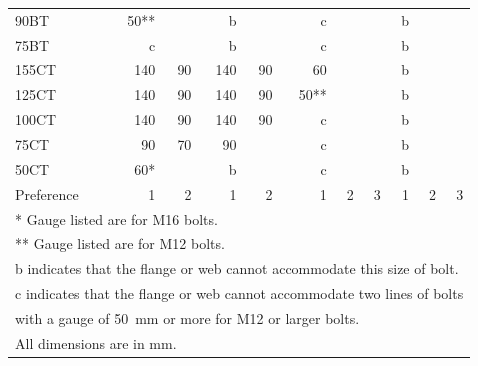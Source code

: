\begin{table}[H]
\begin{minipage}{.8\linewidth}
\begin{tabular}{l|rr|rr|rrr|rrr}
	90BT                        & 50** &                   &   b &                    &    c &    &              &   b &    &              \\
	75BT                        &    c &                   &   b &                    &    c &    &              &   b &    &              \\
	155CT                       &  140 &                90 & 140 &                 90 &   60 &    &              &   b &    &              \\
	125CT                       &  140 &                90 & 140 &                 90 & 50** &    &              &   b &    &              \\
	100CT                       &  140 &                90 & 140 &                 90 &    c &    &              &   b &    &              \\
	75CT                        &   90 &                70 &  90 &                    &    c &    &              &   b &    &              \\
	50CT                        &  60* &                   &   b &                    &    c &    &              &   b &    &              \\
	Preference                  &    1 &                 2 &   1 &                  2 &    1 &  2 &            3 &   1 &  2 &            3 \\ \bottomrule
	\multicolumn{11}{l}{* Gauge listed are for M16 bolts.}                                                                                 \\
	\multicolumn{11}{l}{** Gauge listed are for M12 bolts.}                                                                                \\
	\multicolumn{11}{l}{b indicates that the flange or web cannot accommodate this size of bolt.}                                          \\
	\multicolumn{11}{l}{c indicates that the flange or web cannot accommodate two lines of bolts}                                          \\
	\multicolumn{11}{l}{with a gauge of \SI{50}{\mm} or more for M12 or larger bolts.}                                                     \\
	\multicolumn{11}{l}{All dimensions are in \si{\mm}.}
\end{tabular}
\end{minipage}
\begin{minipage}{.19\linewidth}\centering

\end{minipage}
\end{table}
